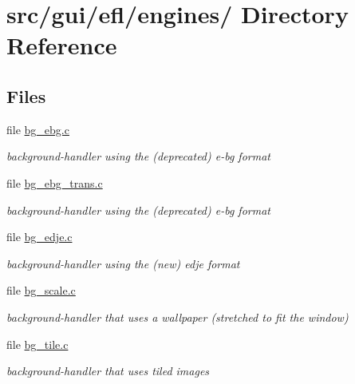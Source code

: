 \hypertarget{dir_000013}{
\section{src/gui/efl/engines/ Directory Reference}
\label{dir_000013}
}
\subsection*{Files}
\begin{CompactItemize}
\item 
file \hyperlink{bg__ebg_8c}{bg\_\-ebg.c}
\begin{CompactList}\small\item\em background-handler using the (deprecated) e-bg format \item\end{CompactList}

\item 
file \hyperlink{bg__ebg__trans_8c}{bg\_\-ebg\_\-trans.c}
\begin{CompactList}\small\item\em background-handler using the (deprecated) e-bg format \item\end{CompactList}

\item 
file \hyperlink{bg__edje_8c}{bg\_\-edje.c}
\begin{CompactList}\small\item\em background-handler using the (new) edje format \item\end{CompactList}

\item 
file \hyperlink{bg__scale_8c}{bg\_\-scale.c}
\begin{CompactList}\small\item\em background-handler that uses a wallpaper (stretched to fit the window) \item\end{CompactList}

\item 
file \hyperlink{bg__tile_8c}{bg\_\-tile.c}
\begin{CompactList}\small\item\em background-handler that uses tiled images \item\end{CompactList}


\end{CompactItemize}
